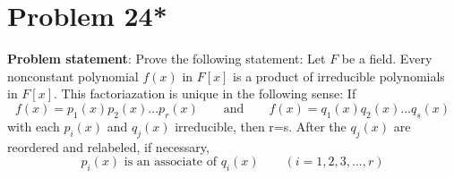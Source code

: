 \documentclass{article} %
\begin{document}
\newpage

\section*{Problem 24*}


\textbf{Problem statement}: Prove the following statement: Let $F$ be a field.  Every nonconstant polynomial $f(x)$ in $F[x]$ is a product of irreducible polynomials in $F[x]$.  This factoriazation is unique in the following sense: If \[f(x) = p_1(x)p_2(x)...p_r(x) \qquad \text{and} \qquad f(x) = q_1(x)q_2(x)...q_s(x)\] with each $p_i(x)$ and $q_j(x)$ irreducible, then r=s.  After the $q_j(x)$ are reordered and relabeled, if necessary, \[p_i(x) \text{ is an associate of } q_i(x)  \qquad (i = 1,2,3,...,r)\]
\\
\end{document}
